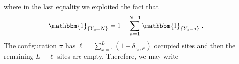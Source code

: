 \documentclass[10pt]{article}
\numberwithin{equation}{section}
\numberwithin{equation}{subsection}
\newcommand{\dt}{\;.}
\begin{document}
where in the last equality we exploited the fact that 
\begin{equation}\label{prova}			\mathbbm{1}_{\{Y_{x}=N\}}=1-\sum_{a=1}^{N-1}\mathbbm{1}_{\{Y_{x}=a\}}\dt
\end{equation}
The configuration $\bm{\tau}$ has $\ell=\sum_{x=1}^{L}(1-\delta_{\tau_{x},N})$ occupied sites and then the remaining $L-\ell$ sites are empty. %
Therefore, we may write
\end{document}
